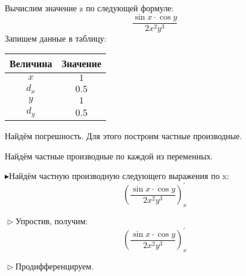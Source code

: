 \documentclass[12pt]{article}
\begin{document}
Вычислим значение z по следующей формуле:
\begin{dmath*}
 \frac {\sin x \cdot \cos y} {2x^{2}y^{3}} \end{dmath*}
Запишем данные в таблицу:

\begin{tabular}{|c|c|}
 \hline
 Величина&Значение\\
 \hline
$x$&$1$\\
\hline
$d_x$&$0.5$\\
\hline
$y$&$1$\\
\hline
$d_y$&$0.5$\\
\hline
\end{tabular}

Найдём погрешность. Для этого построим частные производные.

Найдём частные производные по каждой из переменных.

$\blacktriangleright$Найдём частную производную следующего выражения по x:
                             \begin{dmath*}
                             \left( \frac {\sin x \cdot \cos y} {2x^{2}y^{3}} \right)_{x}^{\prime}
                             \end{dmath*}

$\vartriangleright$Упростив, получим: 
                             \begin{dmath*}
                             \left( \frac {\sin x \cdot \cos y} {2x^{2}y^{3}} \right)_{x}^{\prime}
                             \end{dmath*}

$\vartriangleright$Продифференцируем.
\end{document}
